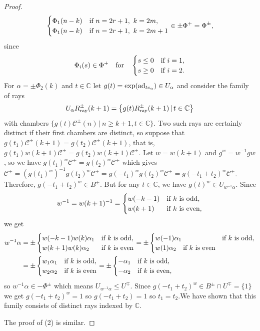 \documentclass[pdftex]{sigma}
\numberwithin{equation}{section}
\def\C{{\mathbb C}}
\def\a{\alpha}
\def\roots{{\Phi}}
\def\cC{\mathcal C}
\begin{document}
\begin{proof}
\begin{align*}
\begin{cases}
\roots_1(n-k)& \hbox{if }n = 2r+1,\ k = 2m, \\
\roots_1(n-k)& \hbox{if }n = 2r+1,\ k = 2m+1
\end{cases} \in \pm \roots^+ = \roots^\pm,
\end{align*}
since
\[\roots_i(s) \in \roots^+ \quad \hbox{for} \quad \begin{cases} s\leq 0 & \hbox{if }i = 1, \\ s\geq 0 & \hbox{if }i=2. \end{cases}\]
For $\a = \pm\roots_2(k)$ and $t\in\C$ let $g(t) = \exp({\rm ad}_{te_\a})\in U_\a$ and consider the family of rays
\[U_{\a} R^\pm_{\rm ray}(k+1) = \big\{g(t) R^\pm_{\rm ray}(k+1)\, |\, t\in\C \big\}\]
with chambers $\big\{g(t) \cC^\pm(n)\, |\, n\geq k+1, t\in\C \big\}$. Two such rays are certainly distinct if their first chambers are distinct, so suppose that $g(t_1) \cC^\pm(k+1) = g(t_2) \cC^\pm(k+1)$, that is,
$g(t_1) w(k+1) \cC^\pm = g(t_2) w(k+1) \cC^\pm$. Let $w = w(k+1)$ and $g^w = w^{-1} g w$, so we have
$g(t_1)^w \cC^\pm = g(t_2)^w \cC^\pm$ which gives $\cC^\pm = (g(t_1)^w)^{-1} g(t_2)^w \cC^\pm =
g(-t_1)^w g(t_2)^w \cC^\pm = g(-t_1+t_2)^w \cC^\pm$. Therefore, $g(-t_1+t_2)^w \in B^\pm$.
But for any $t\in\C$, we have $g(t)^w\in U_{w^{-1}\a}$.
Since
\[w^{-1} = w(k+1)^{-1} = \begin{cases} w(-k-1)& \hbox{if }k\hbox{ is odd}, \\
w(k+1)& \hbox{if }k\hbox{ is even}, \end{cases}\]
we get
\begin{align*}
w^{-1} \a & = \pm \begin{cases} w(-k-1) w(k)\a_1& \hbox{if }k\hbox{ is odd}, \\
w(k+1)w(k)\a_2& \hbox{if }k\hbox{ is even} \end{cases}
= \pm \begin{cases} w(-1) \a_1& \hbox{if }k\hbox{ is odd}, \\
w(1) \a_2\quad\hbox{if }k\hbox{ is even} \end{cases}\\
& = \pm \begin{cases} w_1 \a_1& \hbox{if }k\hbox{ is odd}, \\
w_2 \a_2& \hbox{if }k\hbox{ is even} \end{cases}
= \pm \begin{cases} -\a_1& \hbox{if }k\hbox{ is odd}, \\
-\a_2& \hbox{if }k\hbox{ is even}, \end{cases}
\end{align*}
so $w^{-1} \a \in -\roots^\pm$ which means $U_{w^{-1}\a} \leq U^\mp$.
Since $g(-t_1+t_2)^w \in B^\pm\cap U^\mp = \{1\}$ we get $g(-t_1+t_2)^w = 1$ so $g(-t_1+t_2) = 1$ so
$t_1 = t_2$.We have shown that this family consists of distinct rays indexed by $\C$.

The proof of (2) is similar.
\end{proof}
\end{document}
